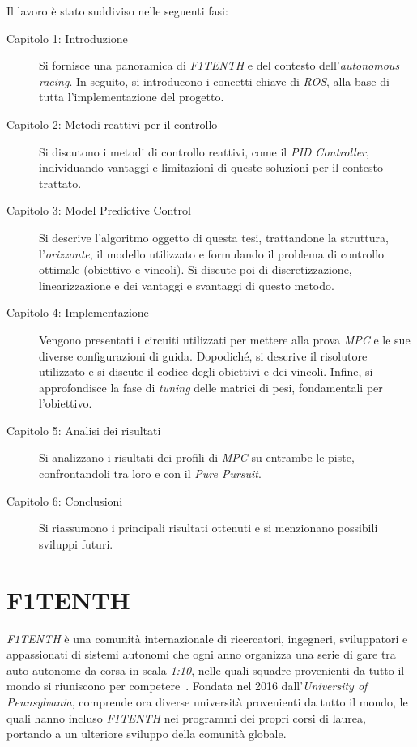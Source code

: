 Il lavoro è stato suddiviso nelle seguenti fasi:
\begin{description}
\item[Capitolo 1: Introduzione] Si fornisce una panoramica di \textit{F1TENTH} e del 
contesto dell'\textit{autonomous racing}. In seguito, si introducono i concetti 
chiave di \textit{ROS}, alla base di tutta l'implementazione del progetto.
\item[Capitolo 2: Metodi reattivi per il controllo] Si discutono i metodi di controllo 
reattivi, come il \textit{PID Controller}, individuando vantaggi e limitazioni di queste
soluzioni per il contesto trattato.
\item[Capitolo 3: Model Predictive Control] Si descrive l'algoritmo oggetto di questa 
tesi, trattandone la struttura, l'\textit{orizzonte}, il modello utilizzato e formulando
il problema di controllo ottimale (obiettivo e vincoli). 
Si discute poi di discretizzazione, linearizzazione e dei vantaggi e svantaggi di questo metodo.
\item[Capitolo 4: Implementazione] Vengono presentati i circuiti utilizzati per mettere alla
prova \textit{MPC} e le sue diverse configurazioni di guida. Dopodiché, si descrive il 
risolutore utilizzato e si discute il codice degli obiettivi e dei vincoli. 
Infine, si approfondisce la fase di \textit{tuning} delle matrici di pesi, fondamentali per l'obiettivo.
\item[Capitolo 5: Analisi dei risultati] Si analizzano i risultati dei profili di \textit{MPC} 
su entrambe le piste, confrontandoli tra loro e con il \textit{Pure Pursuit}.
\item[Capitolo 6: Conclusioni] Si riassumono i principali risultati ottenuti e si
menzionano possibili sviluppi futuri.
\end{description}

\section{F1TENTH}
\textit{F1TENTH} è una comunità internazionale di ricercatori, ingegneri, sviluppatori e appassionati di sistemi autonomi che ogni anno organizza una serie di gare
tra auto autonome da corsa in scala \textit{1:10}, nelle quali squadre provenienti 
da tutto il mondo si riuniscono per competere~\cite{f1tenth}.
Fondata nel 2016 dall'\textit{University of Pennsylvania}, comprende ora diverse università 
provenienti da tutto il mondo, le quali hanno incluso \textit{F1TENTH} nei programmi dei propri 
corsi di laurea, portando a un ulteriore sviluppo della comunità globale.

